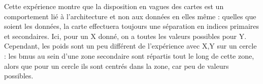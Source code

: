 Cette expérience montre que la disposition en vagues des cartes est un comportement lié à l'architecture et non aux données en elles même : quelles que soient les données, la carte effectuera toujours une séparation en indices primaires et secondaires. Ici, pour un X donné, on a toutes les valeurs possibles pour Y.
Cependant, les poids sont un peu différent de l'expérience avec X,Y sur un cercle : les bmus au sein d'une zone secondaire sont répartis tout le long de cette zone, alors que pour un cercle ils sont centrés dans la zone, car peu de valeurs possibles.